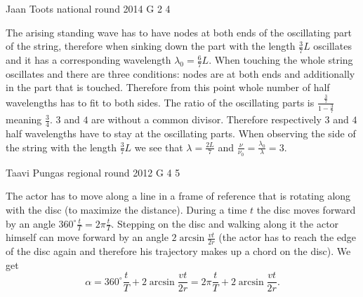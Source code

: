 \documentclass[11pt]{article}
\begin{document}
{Jaan Toots} %
{national round} %
{2014} %
{G 2} %
{4} %
{

\ifEngSolution
The arising standing wave has to have nodes at both ends of the oscillating part of the string, therefore when sinking down the part with the length $\frac{3}{7}L$ oscillates and it has a corresponding wavelength $\lambda_0=\frac{6}{7}L$. When touching the whole string oscillates and there are three conditions: nodes are at both ends and additionally in the part that is touched. Therefore from this point whole number of half wavelengths has to fit to both sides. The ratio of the oscillating parts is $\frac{\frac{3}{7}}{1-\frac{3}{7}}$ meaning $\frac{3}{4}$. $3$ and $4$ are without a common divisor. Therefore respectively $3$ and $4$ half wavelengths have to stay at the oscillating parts. When observing the side of the string with the length $\frac{3}{7}L$ we see that $\lambda=\frac{2L}{7}$ and $\frac{\nu}{\nu_0}=\frac{\lambda_0}{\lambda}=3$.
\fi
}

{Taavi Pungas} %
{regional round} %
{2012} %
{G 4} %
{5} %
{

\ifEngSolution
The actor has to move along a line in a frame of reference that is rotating along with the disc (to maximize the distance). During a time $t$ the disc moves forward by an angle $360^\circ\frac{t}{T}=2\pi\frac{t}{T}$. Stepping on the disc and walking along it the actor himself can move forward by an angle $2\arcsin\frac{vt}{2r}$ (the actor has to reach the edge of the disc again and therefore his trajectory makes up a chord on the disc). We get
$$\alpha=360^\circ\frac{t}{T}+2\arcsin\frac{vt}{2r}=2\pi\frac{t}{T}+2\arcsin\frac{vt}{2r}.$$
\fi
}
\end{document}
